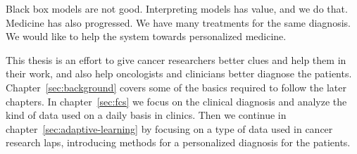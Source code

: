 Black box models are not good. Interpreting models has value, and we do that.
Medicine has also progressed. We have many treatments for the same diagnosis. We
would like to help the system towards personalized medicine.

This thesis is an effort to give cancer researchers better clues and help them
in their work, and also help oncologists and clinicians better diagnose the
patients. Chapter~\ref{sec:background} covers some of the basics required to
follow the later chapters. In chapter~\ref{sec:fcs} we focus on the clinical
diagnosis and analyze the kind of data used on a daily basis in clinics. Then we
continue in chapter~\ref{sec:adaptive-learning} by focusing on a type of data
used in cancer research laps, introducing methods for a personalized diagnosis
for the patients.
